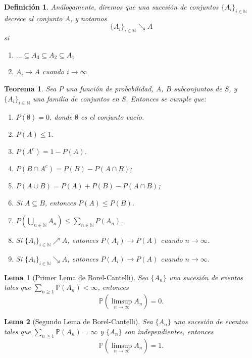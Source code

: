 \documentclass{report}
\newtheorem{thm}{Teorema}[section]
\newtheorem{lem}{Lema}[section]
\newtheorem{dfn}{Definición}[section]
\begin{document}
\begin{dfn}
Análogamente, diremos que una sucesión de conjuntos $\{A_i\}_{i\in\mathbb{N}}$ \emph{decrece} al conjunto $A$, y notamos
$$
\{A_i\}_{i\in\mathbb{N}}\searrow A
$$
si
\begin{enumerate}
    \item $\ldots \subseteq A_3 \subseteq A_2 \subseteq A_1 $
    \item $A_i \rightarrow A$ cuando $i\rightarrow \infty$
\end{enumerate}
\end{dfn}

\begin{thm}
Sea \( P \) una función de probabilidad, $A$, $B$ subconjuntos de \(S\), y $\{A_i\}_{i\in\mathbb{N}}$ una familia de conjuntos en $S$. 
Entonces se cumple que:

\begin{enumerate}
    \item \( P(\emptyset) = 0 \), donde \( \emptyset \) es el conjunto vacío.
    \item \( P(A) \leq 1 \).
    \item \( P(A^c) = 1 - P(A) \).
    \item \( P(B \cap A^c) = P(B) - P(A \cap B) \);
    \item \( P(A \cup B) = P(A) + P(B) - P(A \cap B) \);
    \item Si \( A \subseteq B \), entonces \( P(A) \leq P(B) \).
    \item $P\left(\bigcup_{n\in\mathbb{N}}A_n\right) \leq \sum_{n\in\mathbb{N}}P(A_n)$.
    \item Si $\{A_i\}_{i\in\mathbb{N}}\nearrow A$, entonces $P(A_i)\rightarrow P(A)$ cuando $n\rightarrow \infty$.
    \item Si $\{A_i\}_{i\in\mathbb{N}}\searrow A$, entonces $P(A_i)\rightarrow P(A)$ cuando $n\rightarrow \infty$.
\end{enumerate}
\end{thm}

\begin{lem}[Primer Lema de Borel-Cantelli] \label{primer lema de Borel-Cantelli}
Sea \( \{A_n\} \) una sucesión de eventos tales que \( \sum_{n \geq 1} \mathbb{P}(A_n) < \infty \), entonces
\[
\mathbb{P} \left( \limsup_{n \to \infty} A_n \right) = 0.
\]
\end{lem}

\begin{lem}[Segundo Lema de Borel-Cantelli] \label{segundo  lema de Borel-Cantelli}
Sea \( \{A_n\} \) una sucesión de eventos tales que \( \sum_{n \geq 1} \mathbb{P}(A_n) = \infty \) y \( \{A_n\} \) son independientes, entonces
\[
\mathbb{P} \left( \limsup_{n \to \infty} A_n \right) = 1.
\]
\end{lem}
\end{document}
